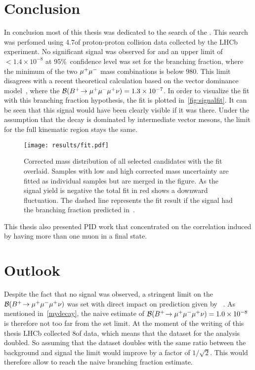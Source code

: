\section{Conclusion}
In conclusion most of this thesis was dedicated to the search of the \Bmumumu.
This search was perfomed using 4.7\invfb of proton-proton collision data collected by the \gls{LHCb} experiment. No significant signal was observed for \Bmumumu and an upper limit of $< 1.4\times 10^{-8}$ at 95\%~confidence level was set for the branching fraction, where the minimum of the two ${\mu^+\mu^-}$ mass combinations is below $980$\mevcc. This limit disagrees with a recent theoretical calculation based on the vector dominance model~\cite{Danilina:2018uzr}, where the $\mathcal{B}({{{B}^+}}\!\rightarrow {\ensuremath{\mu^+\mu^-\mu^+}}\nu)=1.3\times 10^{-7}$. In order to visualize the fit with this branching fraction hypothesis, the fit is plotted in~\autoref{fig:signalfit}. It can be seen that this signal would have been clearly visible if it was there. Under the assumption that the decay is dominated by intermediate vector mesons, the limit for the full kinematic region stays the same.


\begin{figure}[t]
  \centering
  \texttt{[image: results/fit.pdf]}
  \caption{Corrected mass distribution of all selected \Bmumumu
    candidates with the fit overlaid. Samples with low and high
    corrected mass uncertainty are fitted as individual samples but
    are merged in the figure. As the signal yield is negative the total fit
    in red shows a downward fluctuation. The dashed line represents the fit
    result if the signal had the branching fraction predicted in~\cite{Danilina:2018uzr}.}
  \label{fig:signalfit}
\end{figure}


This thesis also presented \gls{PID} work that concentrated on the correlation induced by having more than one muon in a final state.


\section{Outlook}
Despite the fact that no signal was observed, a stringent limit on the $\mathcal{B}({{{B}^+}}\!\rightarrow {\ensuremath{\mu^+\mu^-\mu^+}}\nu)$ was set with direct impact on prediction given by ~\cite{Danilina:2018uzr}. As mentioned in~\autoref{mydecay}, the naive estimate of $\mathcal{B}({{{B}^+}}\!\rightarrow {\ensuremath{\mu^+\mu^-\mu^+}}\nu)=1.0\times 10^{-8}$ is therefore not too far from the set limit. At the moment of the writing of this thesis \gls{LHCb} collected 8\invfb of data, which means that the dataset for the analysis doubled. So assuming that the dataset doubles with the same ratio between the background and signal the limit would improve by a factor of $1/\sqrt{2}$. This would therefore allow to reach the naive branching fraction estimate. 


